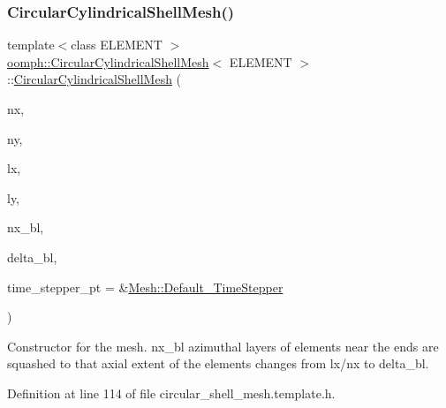 \mbox{\label{classoomph_1_1CircularCylindricalShellMesh_aba83d68289f90a8567887443c3b9c6f0}} 
\subsubsection{\texorpdfstring{Circular\+Cylindrical\+Shell\+Mesh()}{CircularCylindricalShellMesh()}\hspace{0.1cm}{\footnotesize\ttfamily [3/3]}}
{\footnotesize\ttfamily template$<$class E\+L\+E\+M\+E\+NT $>$ \\
\hyperlink{classoomph_1_1CircularCylindricalShellMesh}{oomph\+::\+Circular\+Cylindrical\+Shell\+Mesh}$<$ E\+L\+E\+M\+E\+NT $>$\+::\hyperlink{classoomph_1_1CircularCylindricalShellMesh}{Circular\+Cylindrical\+Shell\+Mesh} (\begin{DoxyParamCaption}\item[{const unsigned \&}]{nx,  }\item[{const unsigned \&}]{ny,  }\item[{const double \&}]{lx,  }\item[{const double \&}]{ly,  }\item[{const unsigned \&}]{nx\+\_\+bl,  }\item[{const double \&}]{delta\+\_\+bl,  }\item[{\hyperlink{classoomph_1_1TimeStepper}{Time\+Stepper} $\ast$}]{time\+\_\+stepper\+\_\+pt = {\ttfamily \&\hyperlink{classoomph_1_1Mesh_a12243d0fee2b1fcee729ee5a4777ea10}{Mesh\+::\+Default\+\_\+\+Time\+Stepper}} }\end{DoxyParamCaption})\hspace{0.3cm}{\ttfamily [inline]}}



Constructor for the mesh. nx\+\_\+bl azimuthal layers of elements near the ends are squashed to that axial extent of the elements changes from lx/nx to delta\+\_\+bl. 



Definition at line 114 of file circular\+\_\+shell\+\_\+mesh.\+template.\+h.




